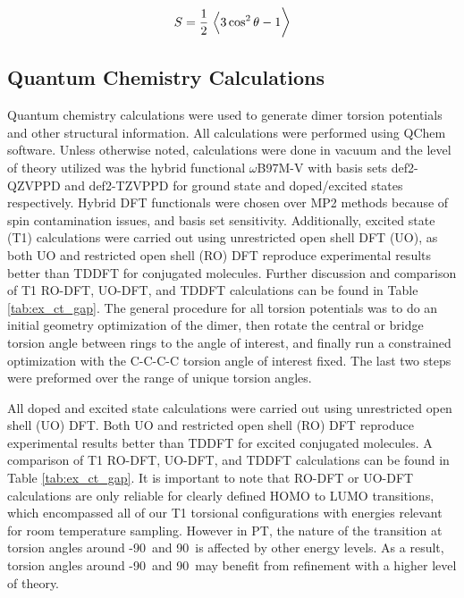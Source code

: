 \begin{equation}
\label{eq:S}
S = \frac{1}{2} \ \Big \langle \large 3\cos^2\theta - 1 \Big \rangle
\end{equation}

\subsection{Quantum Chemistry Calculations}
Quantum chemistry calculations were used to generate dimer torsion potentials and other structural information. All calculations were performed using QChem software.\cite{Shao2015} Unless otherwise noted, calculations were done in vacuum and the level of theory utilized was the hybrid functional $\omega$B97M-V with basis sets def2-QZVPPD and def2-TZVPPD for ground state and doped/excited states respectively.\cite{Mardirossian2016, Weigend2005} Hybrid DFT functionals were chosen over MP2 methods because of spin contamination issues\cite{Salzner2014}, and basis set sensitivity. Additionally, excited state (T1) calculations were carried out using unrestricted open shell DFT (UO), as both UO and restricted open shell (RO) DFT reproduce experimental results better than TDDFT for conjugated molecules.\cite{Hait2016} Further discussion and comparison of T1 RO-DFT, UO-DFT, and TDDFT calculations can be found in Table \ref{tab:ex_ct_gap}. The general procedure for all torsion potentials was to do an initial geometry optimization of the dimer, then rotate the central or bridge torsion angle between rings to the angle of interest, and finally run a constrained optimization with the C-C-C-C torsion angle of interest fixed. The last two steps were preformed over the range of unique torsion angles.

All doped and excited state calculations were carried out using unrestricted open shell (UO) DFT. Both UO and restricted open shell (RO) DFT reproduce experimental results better than TDDFT for excited conjugated molecules.\cite{Hait2016} A comparison of T1 RO-DFT, UO-DFT, and TDDFT calculations can be found in Table \ref{tab:ex_ct_gap}. It is important to note that RO-DFT or UO-DFT calculations are only reliable for clearly defined HOMO to LUMO transitions, which encompassed all of our T1 torsional configurations with energies relevant for room temperature sampling. However in PT, the nature of the transition at torsion angles around -90\textdegree \ and 90\textdegree \ is affected by other energy levels. As a result, torsion angles around -90\textdegree \ and 90\textdegree \ may benefit from refinement with a higher level of theory.
